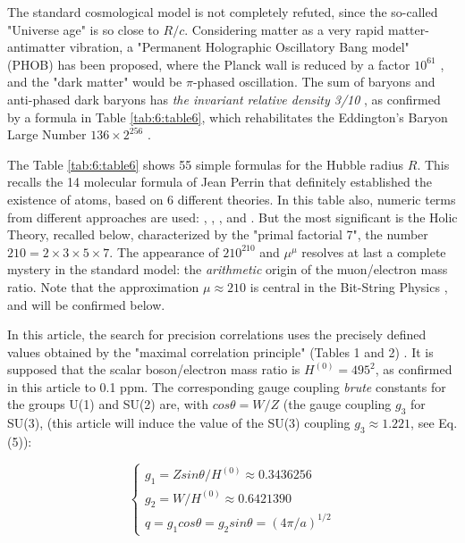 \documentclass[a4paper,9pt]{article}
\begin{document}
The standard cosmological model is not completely refuted, since the so-called "Universe age" is so close to $R/c$. Considering matter as a very rapid matter-antimatter vibration, a "Permanent Holographic Oscillatory Bang model" (PHOB) has been proposed, where the Planck wall is reduced by a factor $10^{61}$ \cite{Sanchez4}, and the "dark matter" would be $\pi$\--phased oscillation. The sum of baryons and anti-phased dark baryons has\textit{ the invariant relative density 3/10} \cite{Sanchez3}, as confirmed by a formula in Table \ref{tab:6:table6}, which rehabilitates the Eddington's Baryon Large Number $136\times 2^{256}$ \cite{Eddington}. 




%

The Table \ref{tab:6:table6} shows 55 simple formulas for the Hubble radius $R$. This recalls the 14 molecular formula of Jean Perrin that definitely established the existence of atoms, based on 6 different theories. In this table also, numeric terms from different approaches are used:  \cite{Davies}, \cite{Rees}, \cite{Eddington}, \cite{Bastin} and \cite{Atiyah}. But the most significant is the Holic Theory, recalled below, characterized by the "primal factorial 7", the number $210 = 2 \times 3\times 5\times7$. The appearance of $210^{210}$ and $\mu^{\mu}$ resolves at last a complete mystery in the standard model: the \textit{arithmetic} origin of the muon/electron mass ratio. Note that the approximation $\mu \approx 210$ is central in the Bit-String Physics \cite{Noyes}, and will be confirmed below. 


In this article, the search for precision correlations uses the precisely defined values obtained by the "maximal correlation principle" (Tables 1 and 2) \cite{Sanchez3}. It is supposed that the scalar boson/electron mass ratio is $H^{(0)}=495^2$, as confirmed in this article to 0.1 ppm. The corresponding gauge coupling \textit{brute} constants for the groups U(1) and SU(2) are, with $cos \theta = W/Z$ (the gauge coupling $g_3$ for SU(3), (this article will induce the value of the SU(3) coupling $g_3 \approx 1.221$, see Eq.(5)): 

\begin{equation}\label{Eq3}
 \left\{
    \begin{array}{ll}
    g_1 = Zsin\theta /H^{(0)} \approx 0.3436256 \\
    g_2 = W/H^{(0)} \approx 0.6421390\\ 
    q = g_1 cos \theta = g_2 sin \theta = (4\pi/a)^{1/2}
    
    \end{array}
\right.
\end{equation}
\end{document}
